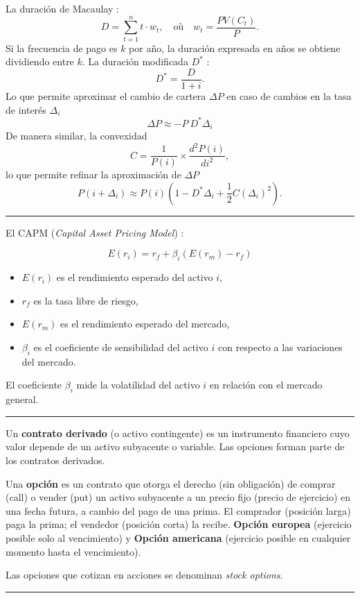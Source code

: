 \begin{f}

La duración de Macaulay :
\[ 		
D = \sum_{t=1}^{n} t \cdot w_t, \quad \text{où} \quad w_t = \frac{PV(C_t)}{P}.
 \]	
Si la frecuencia de pago es \(k\) por año, la duración expresada en años se obtiene dividiendo entre \(k\).
La duración modificada \(D^*\) :
\[ 	
D^* = \frac{D}{1 + i}.
 \]
Lo que permite aproximar el cambio de cartera \(\Delta P\) en caso de cambios en la tasa de interés \(\Delta_i\)
\[ 
\Delta P \approx -P\ D^* \Delta_i 
 \]
De manera similar, la convexidad
\[ 	
C = \frac{1}{P(i)} \times \frac{d^2 P(i)}{di^2},
 \]
lo que permite refinar la aproximación de \(\Delta P\)
\[ 	
P(i + \Delta_i) \approx P(i) \left( 1 -D^*\Delta_i + \frac{1}{2} C (\Delta_i)^2 \right).
 \]
\end{f}
\hrule



\begin{f}[CAPM]
  El CAPM (\textit{Capital Asset Pricing Model})  :

\[
E(r_i) = r_f + \beta_i (E(r_m) - r_f)
\]

\begin{itemize}
    \item \( E(r_i) \) es el rendimiento esperado del activo \( i \),
    \item \( r_f \) es la tasa libre de riesgo,
    \item \( E(r_m) \) es el rendimiento esperado del mercado,
    \item \( \beta_i \) es el coeficiente de sensibilidad del activo \( i \) con respecto a las variaciones del mercado.
\end{itemize}

El coeficiente \( \beta_i \) mide la volatilidad del activo \( i \) en relación con el mercado general.

\end{f}
\hrule


\begin{f}

Un \textbf{contrato derivado} (o activo contingente) es un instrumento financiero cuyo valor depende de un activo subyacente o variable. Las opciones forman parte de los contratos derivados.


Una \textbf{opción} es un contrato que otorga el derecho (sin obligación) de comprar (call) o vender (put) un activo subyacente a un precio fijo (precio de ejercicio) en una fecha futura, a cambio del pago de una prima.
El comprador (posición larga) paga la prima; el vendedor (posición corta) la recibe. \textbf{Opción europea} (ejercicio posible solo al vencimiento) y   
 \textbf{Opción americana} (ejercicio posible en cualquier momento hasta el vencimiento).

Las opciones que cotizan en acciones se denominan \textit{stock options}.

\end{f}
\hrule


